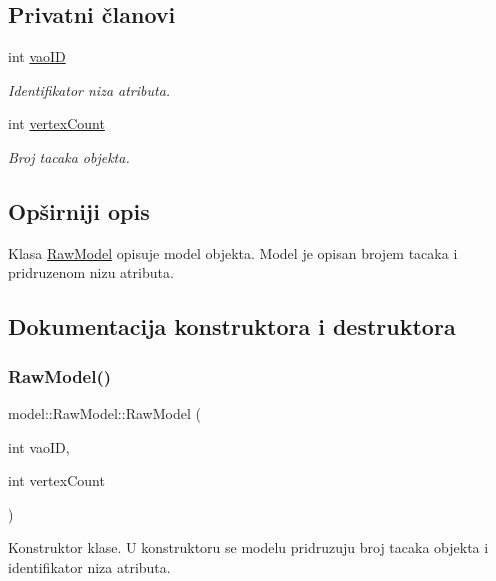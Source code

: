 \subsection*{Privatni članovi}
\begin{DoxyCompactItemize}
\item 
int \hyperlink{classmodel_1_1RawModel_a325b2b7e719afce688027efbf92e27b7}{vao\+ID}
\begin{DoxyCompactList}\small\item\em Identifikator niza atributa. \end{DoxyCompactList}\item 
int \hyperlink{classmodel_1_1RawModel_a76a976df29d34a1d0f7a7e8f42a4477c}{vertex\+Count}
\begin{DoxyCompactList}\small\item\em Broj tacaka objekta. \end{DoxyCompactList}\end{DoxyCompactItemize}


\subsection{Opširniji opis}
Klasa \hyperlink{classmodel_1_1RawModel}{Raw\+Model} opisuje model objekta. Model je opisan brojem tacaka i pridruzenom nizu atributa. 

\subsection{Dokumentacija konstruktora i destruktora}
\mbox{\label{classmodel_1_1RawModel_ab7054a4703b26233f6a366721ea48353}} 
\subsubsection{\texorpdfstring{Raw\+Model()}{RawModel()}}
{\footnotesize\ttfamily model\+::\+Raw\+Model\+::\+Raw\+Model (\begin{DoxyParamCaption}\item[{int}]{vao\+ID,  }\item[{int}]{vertex\+Count }\end{DoxyParamCaption})}



Konstruktor klase. U konstruktoru se modelu pridruzuju broj tacaka objekta i identifikator niza atributa. 


